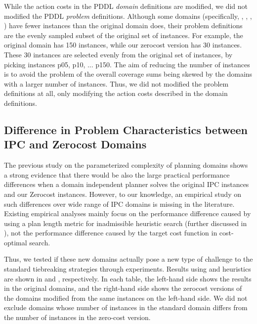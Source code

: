 While the action costs in the PDDL \emph{domain} definitions are modified,
we did not modified the PDDL \emph{problem} definitions.
Although some domains (specifically, , , , ) have fewer instances than the original domain does,
their problem definitions are the evenly sampled subset of the original set of instances.
For example, the original  domain has 150 instances, while our zerocost version has 30 instances.
These 30 instances are selected evenly from the original set of instances, by picking instances p05, p10, ... p150.
% 
The aim of reducing the number of instances is to avoid the problem of the overall coverage sums being skewed by the domains with a larger number of instances.
Thus, we did not modified the problem definitions at all, only modifying the action costs described in the domain definitions.

\subsection{Difference in Problem Characteristics between IPC and Zerocost Domains}

The previous study on the parameterized complexity of planning domains \cite{aghighi2015} shows a strong evidence that there would be also the large practical performance differences when a domain independent planner solves the original IPC instances and our Zerocost instances.
However, to our knowledge, an empirical study on such differences over wide range of IPC domains is missing in the literature.
Existing empirical analyses mainly focus on the performance difference caused by using a plan length metric for inadmissible heuristic search (further discussed in ), not the performance difference caused by the target cost function in cost-optimal search.

Thus, we tested if these new domains actually pose a new type of challenge to the
standard tiebreaking strategies through experiments. Results using \lmcut and \mands
heuristics are shown in  and
, respectively. In each table,
the left-hand side shows the results in the original domains, and the right-hand side
shows the zerocost versions of the domains modified from the same
instances on the left-hand side. We did not exclude domains whose
number of instances in the standard domain differs from the number of instances in the zero-cost version.

